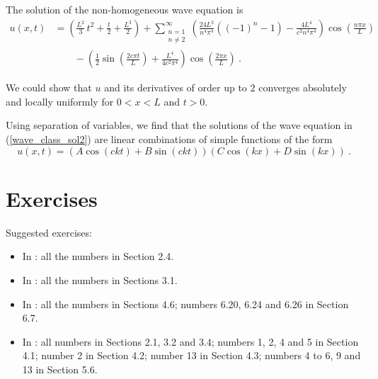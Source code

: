 \begin{egg}
The solution of the non-homogeneous wave equation is
\begin{align*}
u(x,t) &= \left(\frac{L^2}{3}\,t^2 + \frac{t}{2} + \frac{L^3}{2} \right)
+ \sum_{\substack{n=1\\n\neq 2}}^\infty 
\left(\frac{24L^3}{n^4\pi^4} \left( (-1)^n -1 \right)
- \frac{4 L^4}{c^2n^4\pi^4} \right)
\cos\left(\frac{n\pi x}{L}\right) \\
&\qquad  - \left(\frac{1}{2}\sin\left(\frac{2c\pi t}{L}\right)
+ \frac{L^4}{4c^2\pi^4} \right)\cos\left(\frac{2\pi x}{L}\right) \ .
\end{align*} 

We could show that $u$ and its derivatives of order up to $2$
converges absolutely and locally uniformly for $0<x<L$ and $t>0$.
\end{egg}

\begin{rmk}
Using separation of variables, we find that the solutions of the wave
equation in (\ref{wave_class_sol2}) are linear combinations of simple
functions of the form
\[
u(x,t) = (A \cos (ckt) + B \sin (ckt))(C \cos (kx) + D \sin(kx)) \ .
\]
\end{rmk}

\section{Exercises}

Suggested exercises:

\begin{itemize}
\item In \cite{J}: all the numbers in Section 2.4.
\item In \cite{McO}: all the numbers in Sections 3.1.
\item In \cite{PinRub}: all the numbers in Sections 4.6; numbers 6.20,
  6.24 and 6.26 in Section 6.7. 
\item In \cite{Str}: all numbers in Sections 2.1, 3.2 and 3.4;
numbers 1, 2, 4 and 5 in Section 4.1; number 2 in Section 4.2;
number 13 in Section 4.3; numbers 4 to 6, 9 and 13 in Section 5.6. 
\end{itemize}


